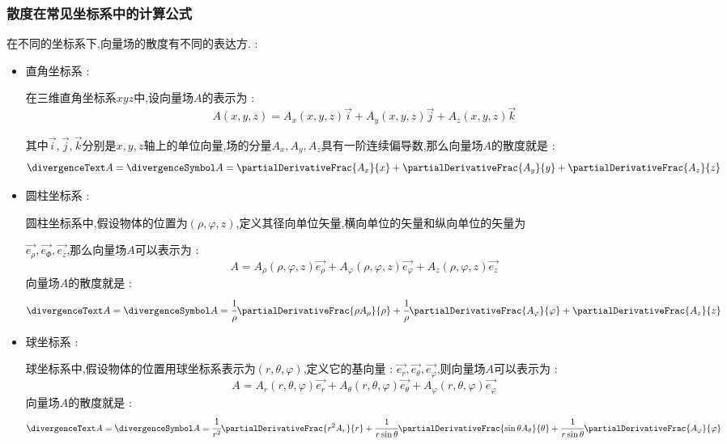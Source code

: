 {{{    \subsubsection{散度在常见坐标系中的计算公式}{
      在不同的坐标系下,向量场的散度有不同的表达方. :
      \begin{itemize}
        \item {
              直角坐标系 :

              在三维直角坐标系$xyz$中,设向量场$A$的表示为 :
              $$
                A(x,y,z) = A_x(x,y,z)\vec{i} + A_y(x,y,z)\vec{j} + A_z(x,y,z)\vec{k}
              $$

              其中$\vec{i},\vec{j},\vec{k}$分别是$x,y,z$轴上的单位向量,场的分量$A_x,A_y,A_z$具有一阶连续偏导数,那么向量场$A$的散度就是 :
              $$
                \divergenceText A = \divergenceSymbol A = \partialDerivativeFrac{A_x}{x} + \partialDerivativeFrac{A_y}{y} + \partialDerivativeFrac{A_z}{z}
              $$
              }
        \item {
              圆柱坐标系 :

              圆柱坐标系中,假设物体的位置为$(\rho,\varphi,z)$,定义其径向单位矢量,横向单位的矢量和纵向单位的矢量为

              $\vec{e_{\rho}},\vec{e_{\varPhi}},\vec{e_z}$,那么向量场$A$可以表示为 :
              $$
                A = A_{\rho}(\rho,\varphi,z)\vec{e_{\rho}} + A_{\varphi}(\rho,\varphi,z)\vec{e_{\varphi}} + A_{z}(\rho,\varphi,z)\vec{e_{z}}
              $$
              向量场$A$的散度就是 :
              $$
                \divergenceText A = \divergenceSymbol A = \cfrac{1}{\rho}\partialDerivativeFrac{\rho A_\rho}{\rho} + \cfrac{1}{\rho}\partialDerivativeFrac{A_\varphi}{\varphi} + \partialDerivativeFrac{A_z}{z}
              $$
              }
        \item {
              球坐标系 :

              球坐标系中,假设物体的位置用球坐标系表示为$(r,\theta,\varphi)$,定义它的基向量 : $\vec{e_r},\vec{e_\theta},\vec{e_\varphi}$,则向量场$A$可以表示为 :
              $$
                A = A_r(r,\theta,\varphi)\vec{e_r} + A_\theta(r,\theta,\varphi)\vec{e_\theta} + A_\varphi(r,\theta,\varphi)\vec{e_\varphi}
              $$
              向量场$A$的散度就是 :
              $$
                \divergenceText A = \divergenceSymbol A = \cfrac{1}{r^2}\partialDerivativeFrac{r^2A_r}{r} + \cfrac{1}{r\sin\theta}\partialDerivativeFrac{\sin\theta A_\theta}{\theta} + \cfrac{1}{r\sin\theta}\partialDerivativeFrac{A_\varphi}{\varphi}
              $$
              }
      \end{itemize}
    }%

}}}
